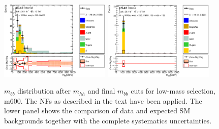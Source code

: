\begin{figure}[!h]
\begin{center}
\includegraphics*[width=0.47\textwidth] {figures/Unblinded_mbb/C_reOpt700_mww_bbpt210_wwpt250_hh600_bbMass_regionA_met25d020.eps}
\includegraphics*[width=0.47\textwidth] {figures/Unblinded_mbb/C_reOpt700_mww_bbpt210_wwpt250_hh600_mbb_bbMass_regionA_met25d020.eps}
\caption[$m_{bb}$ distribution after $m_{hh}$ and final $m_{bb}$ cuts for low-mass selection, m600.]{$m_{bb}$ distribution after $m_{hh}$ and final $m_{bb}$ cuts for low-mass selection, m600. The NFs as described in the text have been applied. The lower panel shows the comparison of data and expected SM backgrounds together with the complete systematics uncertainties.}
\end{center}
\end{figure}
\clearpage

